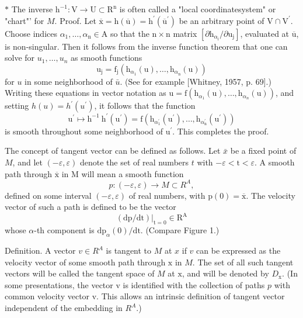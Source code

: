 \documentclass[10pt]{article}
\begin{document}
$*$ The inverse $\mathrm{h}^{-1}: \mathrm{V} \rightarrow \mathrm{U} \subset \mathrm{R}^{\mathrm{n}}$ is often called a "local coordinatesystem" or "chart"' for $M$. Proof. Let $\overline{\mathrm{x}}=\mathrm{h}(\overline{\mathrm{u}})=\mathrm{h}^{\prime}\left(\overline{\mathrm{u}}^{\prime}\right)$ be an arbitrary point of $\mathrm{V} \cap \mathrm{V}^{\prime}$. Choose indices $\alpha_{1}, \ldots, \alpha_{\mathrm{n}} \in \mathrm{A}$ so that the $\mathrm{n} \times \mathrm{n}$ matrix $\left[\partial \mathrm{h}_{\alpha_{\mathrm{i}}} / \partial \mathrm{u}_{\mathrm{j}}\right]$, evaluated at $\overline{\mathrm{u}}$, is non-singular. Then it follows from the inverse function theorem that one can solve for $u_{1}, \ldots, u_{n}$ as smooth functions
$$
\mathrm{u}_{\mathrm{j}}=\mathrm{f}_{\mathrm{j}}\left(\mathrm{h}_{\alpha_{1}}(\mathrm{u}), \ldots, \mathrm{h}_{\alpha_{\mathrm{n}}}(\mathrm{u})\right)
$$
for $u$ in some neighborhood of $\bar{u}$. (See for example [Whitney, 1957, p. 69].) Writing these equations in vector notation as $\mathrm{u}=\mathrm{f}\left(\mathrm{h}_{\alpha_{1}}(\mathrm{u}), \ldots, \mathrm{h}_{\alpha_{n}}(\mathrm{u})\right)$, and setting $h(u)=h^{\prime}\left(u^{\prime}\right)$, it follows that the function
$$
\mathrm{u}^{\prime} \mapsto \mathrm{h}^{-1} \mathrm{~h}^{\prime}\left(\mathrm{u}^{\prime}\right)=\mathrm{f}\left(\mathrm{h}_{\alpha_{1}^{\prime}}\left(\mathrm{u}^{\prime}\right), \ldots, \mathrm{h}_{\alpha_{\mathrm{n}}^{\prime}}\left(\mathrm{u}^{\prime}\right)\right)
$$
is smooth throughout some neighborhood of $\mathrm{u}^{\prime}$. This completes the proof.

The concept of tangent vector can be defined as follows. Let $\bar{x}$ be a fixed point of $M$, and let $(-\varepsilon, \varepsilon)$ denote the set of real numbers $t$ with $-\varepsilon<\mathrm{t}<\varepsilon$. A smooth path through $\overline{\mathrm{x}}$ in $\mathrm{M}$ will mean a smooth function
$$
p:(-\varepsilon, \varepsilon) \rightarrow M \subset R^{A},
$$
defined on some interval $(-\varepsilon, \varepsilon)$ of real numbers, with $\mathrm{p}(0)=\overline{\mathrm{x}}$. The velocity vector of such a path is defined to be the vector
$$
\left.(\mathrm{dp} / \mathrm{dt})\right|_{\mathrm{t}=0} \in \mathrm{R}^{\mathrm{A}}
$$
whose $\alpha$-th component is $\mathrm{dp}_{\alpha}(0) / \mathrm{dt}$. (Compare Figure 1.)

Definition. A vector $v \in R^{A}$ is tangent to $M$ at $x$ if $v$ can be expressed as the velocity vector of some smooth path through $\mathrm{x}$ in $M$. The set of all such tangent vectors will be called the tangent space of $M$ at $\mathrm{x}$, and will be denoted by $D_{\mathrm{x}}$. (In some presentations, the vector $\mathrm{v}$ is identified with the collection of paths $p$ with common velocity vector v. This allows an intrinsic definition of tangent vector independent of the embedding in $R^{A}$.)
\end{document}
